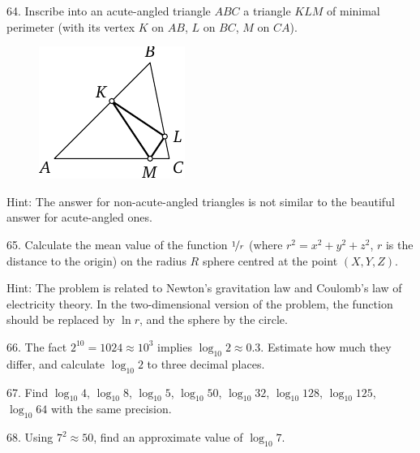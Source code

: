 \begin{problem}{64.}
	Inscribe into an acute-angled triangle $ABC$ a triangle $KLM$ of minimal perimeter
	(with its vertex $K$ on $AB$, $L$ on $BC$, $M$ on $CA$).
	\begin{figure}
		\includegraphics{taskbook-48} 
	\end{figure}

	\begin{note}{Hint:}
		The answer for non-acute-angled triangles is not similar to the beautiful answer for acute-angled ones.
	\end{note}
\end{problem}

\begin{problem}{65.}
	Calculate the mean value of the function  $\nicefrac{1}{r}$ (where
	$r^2=x^2+y^2+z^2$, $r$ is the distance to the origin) on the radius 
	$R$ sphere centred at the point $(X,Y,Z)$.

	\begin{note}{Hint:}
		The problem is related to Newton's gravitation law and Coulomb's law of electricity theory.
		In the two-dimensional version of the problem, the function should be replaced by $\ln r$, and the sphere by the circle.
	\end{note}
\end{problem}

\begin{problem}{66.}
	The fact $2^{10}=1024 \approx 10^3$ implies
	$\log_{10} 2 \approx 0.3$. 	Estimate how much they differ, and calculate $\log_{10} 2$ to three decimal places. 
\end{problem}

\begin{problem}{67.}
	Find $\log_{10} 4$, $\log_{10} 8$,
	$\log_{10} 5$, $\log_{10} 50$, $\log_{10} 32$, $\log_{10} 128$,
	$\log_{10} 125$, $\log_{10} 64$ with the same precision.
\end{problem}

\begin{problem}{68.} 
	Using $7^2 \approx 50$, find an approximate value of $\log_{10} 7$.
\end{problem}

